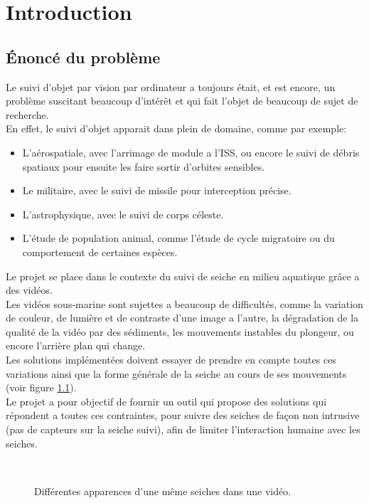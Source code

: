 \chapter{Introduction}





\section{Énoncé du problème}
Le suivi d'objet par vision par ordinateur a toujours était, et est encore, un problème suscitant beaucoup d'intérêt et qui fait l'objet de beaucoup de sujet de recherche.\\
En effet, le suivi d'objet apparait dans plein de domaine, comme par exemple:
\begin{itemize}
	\item L'aérospatiale, avec l'arrimage de module a l'ISS, ou encore le suivi de débris spatiaux pour ensuite les faire sortir d'orbites sensibles.
	\item Le militaire, avec le suivi de missile pour interception précise.
	\item L'astrophysique, avec le suivi de corps céleste.
	\item L'étude de population animal, comme l'étude de cycle migratoire ou du comportement de certaines espèces.\\
\end{itemize}

Le projet se place dans le contexte du suivi de seiche en milieu aquatique grâce a des vidéos.\\
Les vidéos sous-marine sont sujettes a beaucoup de difficultés, comme la variation de couleur, de lumière et de contraste d'une image a l'autre, la dégradation de la qualité de la vidéo par des sédiments, les mouvements instables du plongeur, ou encore l'arrière plan qui change.\\
Les solutions implémentées doivent essayer de prendre en compte toutes ces variations ainsi que la forme générale de la seiche au cours de ses mouvements (voir figure \ref{fig:cuttlefish_variation}).\\
Le projet a pour objectif de fournir un outil qui propose des solutions qui répondent a toutes ces contraintes, pour suivre des seiches de façon non intrusive (pas de capteurs sur la seiche suivi), afin de limiter l'interaction humaine avec les seiches.

\begin{figure}[!htbp]
\center
	\hspace{0.5cm}
	\\
	\hspace{0.5cm}
\caption{Différentes apparences d'une même seiches dans une vidéo.}
\label{fig:cuttlefish_variation}
\end{figure}
\FloatBarrier
\clearpage





